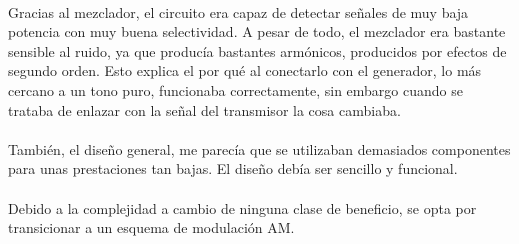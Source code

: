 \paragraph{}
Gracias al mezclador, el circuito era capaz de detectar señales de muy baja potencia con muy buena selectividad. A pesar de todo, el mezclador era bastante sensible al ruido, ya que producía bastantes armónicos, producidos por efectos de segundo orden. Esto explica el por qué al conectarlo con el generador, lo más cercano a un tono puro, funcionaba correctamente, sin embargo cuando se trataba de enlazar con la señal del transmisor la cosa cambiaba.
\paragraph{}
También, el diseño general, me parecía que se utilizaban demasiados componentes para unas prestaciones tan bajas. El diseño debía ser sencillo y funcional.
\paragraph{}
Debido a la complejidad a cambio de ninguna clase de beneficio, se opta por transicionar a un esquema de modulaci\'on AM.
